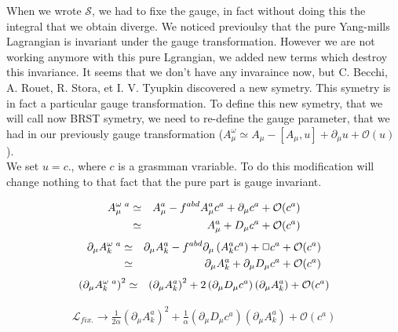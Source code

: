 \documentclass[a4paper,11pt]{article} %
\numberwithin{equation}{section} %
\numberwithin{figure}{section} %
\theoremstyle{plain} %
\theoremstyle{definition} %
\theoremstyle{remark} %
\begin{document}
\noindent
When we wrote $\mathcal{S}$, we had to fixe the gauge, in fact without doing this the integral that we obtain diverge. We noticed previoulsy that the pure Yang-mills Lagrangian is invariant under the gauge transformation. However we are not working anymore with this pure Lgrangian, we added new terms which destroy this invariance. It seems that we don't have any invaraince now, but C. Becchi, A. Rouet, R. Stora, et I. V. Tyupkin discovered a new symetry. This symetry is in fact a particular gauge transformation. To define this new symetry, that we will call now BRST symetry, we need to re-define the gauge parameter, that we had in our previously gauge transformation \big($ A^{\omega}_{\mu} \simeq A_{\mu} - [A_{\mu},u] + \partial_{\mu}u + \mathcal{O} (u)$\big). \\
We set $ u = c$., where $c$ is a grasmman vrariable. To do this modification will change nothing to that fact that the pure part is gauge invariant. 

\noindent
\begin{eqnarray}
 A^{\omega \hspace{1mm} a}_{\mu}    &\simeq&    A^{a}_{\mu} - f^{abd} A^{a}_{\mu} c^{a} + \partial_{\mu}c^{a}  + \mathcal{O} (c^{a})\\
                                    &\simeq&    A^{a}_{\mu}  + D_{\mu} c^{a} + \mathcal{O} (c^{a})
\end{eqnarray}
\begin{eqnarray}
 \partial_{\mu}  A^{\omega \hspace{1mm} a}_{k}    &\simeq&    \partial_{\mu} A^{a}_{k} - f^{abd}  \partial_{\mu} \left( A^{a}_{k} c^{a} \right) 
+ \Box c^{a} + \mathcal{O} (c^{a})  \\
                                                  &\simeq&     \partial_{\mu} A^{a}_{k}  + \partial_{\mu}D_{\mu} c^{a} + \mathcal{O} (c^{a})
\end{eqnarray}
\begin{eqnarray}
 \left( \partial_{\mu}  A^{\omega \hspace{1mm} a}_{k} \right)^{2} &\simeq&  \left( \partial_{\mu} A^{a}_{k} \right)^{2} 
+ 2 \left(  \partial_{\mu}D_{\mu} c^{a}  \right) \left( \partial_{\mu} A^{a}_{k} \right) + \mathcal{O} (c^{a})  
\end{eqnarray}

\begin{eqnarray}
 \mathcal{L}_{fix.}  \rightarrow \frac{1}{2 \alpha} \left( \partial_{\mu} A^{a}_{k} \right)^{2} 
+ \frac{1}{\alpha} \left(  \partial_{\mu}D_{\mu} c^{a}  \right) \left( \partial_{\mu} A^{a}_{k} \right) + \mathcal{O} (c^{a})  
\end{eqnarray}
\end{document}
